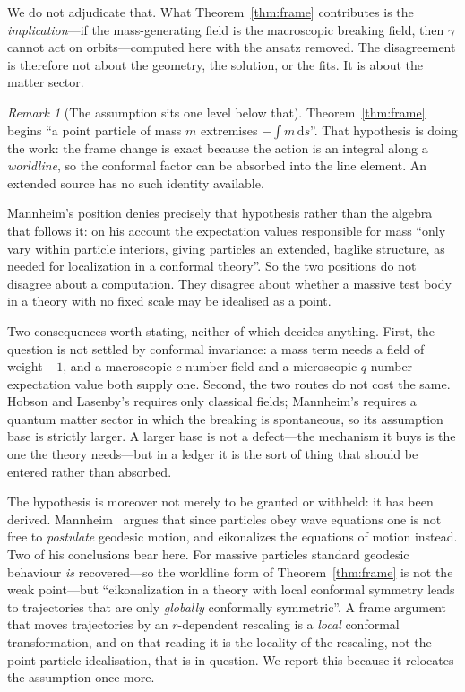 \documentclass[11pt]{article}
\theoremstyle{definition}
\theoremstyle{remark}
\newtheorem{remark}[theorem]{Remark}
\newcommand{\dd}{\mathrm d}
\begin{document}
We do not adjudicate that.  What Theorem~\ref{thm:frame} contributes is the
\emph{implication}---if the mass-generating field is the macroscopic breaking
field, then \(\gamma\) cannot act on orbits---computed here with the ansatz
removed.  The disagreement is therefore not about the geometry, the solution,
or the fits.  It is about the matter sector.

\begin{remark}[The assumption sits one level below that]
\label{rem:pointparticle}
Theorem~\ref{thm:frame} begins ``a point particle of mass \(m\) extremises
\(-\!\int m\,\dd s\)''.  That hypothesis is doing the work: the frame change
is exact because the action is an integral along a \emph{worldline}, so the
conformal factor can be absorbed into the line element.  An extended source has
no such identity available.

Mannheim's position denies precisely that hypothesis rather than the algebra
that follows it: on his account the expectation values responsible for mass
``only vary within particle interiors, giving particles an extended, baglike
structure, as needed for localization in a conformal theory''.  So the two
positions do not disagree about a computation.  They disagree about whether a
massive test body in a theory with no fixed scale may be idealised as a point.

Two consequences worth stating, neither of which decides anything.  First, the
question is not settled by conformal invariance: a mass term needs a field of
weight \(-1\), and a macroscopic \(c\)-number field and a microscopic
\(q\)-number expectation value both supply one.  Second, the two routes do not
cost the same.  Hobson and Lasenby's requires only classical fields; Mannheim's
requires a quantum matter sector in which the breaking is spontaneous, so its
assumption base is strictly larger.  A larger base is not a defect---the
mechanism it buys is the one the theory needs---but in a ledger it is the sort
of thing that should be entered rather than absorbed.

The hypothesis is moreover not merely to be granted or withheld: it has been
derived.  Mannheim~\cite{Mannheim2022b} argues that since particles obey wave
equations one is not free to \emph{postulate} geodesic motion, and eikonalizes
the equations of motion instead.  Two of his conclusions bear here.  For
massive particles standard geodesic behaviour \emph{is} recovered---so the
worldline form of Theorem~\ref{thm:frame} is not the weak point---but
``eikonalization in a theory with local conformal symmetry leads to
trajectories that are only \emph{globally} conformally symmetric''.  A frame
argument that moves trajectories by an \(r\)-dependent rescaling is a
\emph{local} conformal transformation, and on that reading it is the locality
of the rescaling, not the point-particle idealisation, that is in question.  We
report this because it relocates the assumption once more.


\end{remark}
\end{document}
